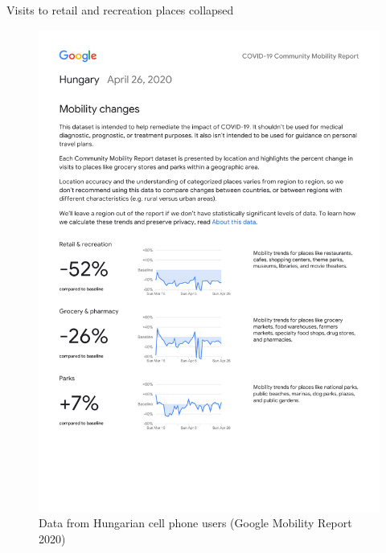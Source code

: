 \documentclass[
  ignorenonframetext,
  aspectratio=1610,
]{beamer}
\begin{document}
\begin{frame}{Visits to retail and recreation places collapsed}
\protect\hypertarget{visits-to-retail-and-recreation-places-collapsed}{}
\begin{figure}
\centering
\includegraphics[width=1\textwidth,height=\textheight]{exhibit/fig/gmr-retail.pdf}
\caption{Data from Hungarian cell phone users (Google Mobility Report
2020)}
\end{figure}
\end{frame}
\end{document}

